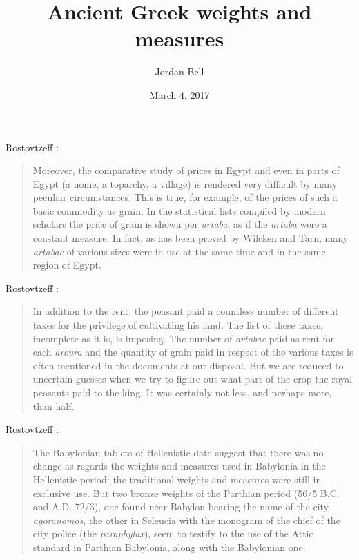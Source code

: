 \documentclass{article}
\begin{document}
\title{Ancient Greek weights and measures}
\author{Jordan Bell}
\date{March 4, 2017}
\maketitle

Rostovtzeff \cite[I, p.~259]{SEHHW}:

\begin{quote}
Moreover, the comparative study of prices in Egypt and even
in parts of Egypt (a nome, a toparchy, a village) is rendered
very difficult by many peculiar circumstances. This is true, for
example, of the prices of such a basic commodity as grain. In
the statistical lists compiled by modern scholars the price of
grain is shown per {\em artaba}, as if the {\em artaba} were a constant
measure. In fact, as has been proved by Wilcken and Tarn,
many {\em artabae} of various sizes were in use at the same time and
in the same region of Egypt.
\end{quote}

Rostovtzeff \cite[I, p.~279]{SEHHW}:

\begin{quote}
In addition to the rent, the peasant paid a countless number
of different taxes for the privilege of cultivating his land. The
list of these taxes, incomplete as it is, is imposing. The number
of {\em artabae} paid as rent for each {\em aroura} and the quantity of grain
paid in respect of the various taxes is often mentioned in the
documents at our disposal. But we are reduced to uncertain
guesses when we try to figure out what part of the crop the
royal peasants paid to the king. It was certainly not less, and
perhaps more, than half.
\end{quote}

Rostovtzeff \cite[I, p.~451]{SEHHW}:

\begin{quote}
The Babylonian tablets of Hellenistic
date suggest that there was no change as regards the weights
and measures used in Babylonia in the Hellenistic period: the
traditional weights and measures were still in exclusive use. 
But two bronze weights of the Parthian period (56/5 B.C. and
A.D. 72/3), one found near Babylon bearing the name of the
city {\em agoranomos}, the other in Seleucia with the monogram of
the chief of the city police (the {\em paraphylax}), seem to testify to the
use of the Attic standard in Parthian Babylonia, along with
the Babylonian one.
\end{quote}
\end{document}
